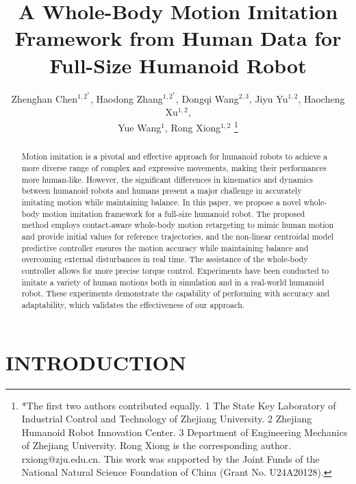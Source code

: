 \documentclass[a4paper, 10pt, conference]{ieeeconf}      %
\title{\LARGE \bf
A Whole-Body Motion Imitation Framework from Human Data for Full-Size Humanoid Robot
}
\author{Zhenghan Chen$^{1,2^*} $, Haodong Zhang$^{1,2^*}$, Dongqi Wang$^{2,3}$, Jiyu Yu$^{1,2}$, Haocheng Xu$^{1,2}$, \\ Yue Wang$^{1}$, Rong Xiong$^{1,2}$ %
\thanks{*The first two authors contributed equally. 1 The State Key Laboratory of Industrial Control and Technology of Zhejiang University. 2 Zhejiang Humanoid Robot Innovation Center. 3 Department of Engineering Mechanics of Zhejiang University. Rong Xiong is the corresponding author. rxiong@zju.edu.cn. This work was supported by the Joint Funds of the National Natural Science Foundation of China (Grant No. U24A20128).}%
}
\begin{document}
\maketitle
\thispagestyle{empty}
\pagestyle{empty}

\begin{abstract}
Motion imitation is a pivotal and effective approach for humanoid robots to achieve a more diverse range of complex and expressive movements, making their performances more human-like. However, the significant differences in kinematics and dynamics between humanoid robots and humans present a major challenge in accurately imitating motion while maintaining balance. In this paper, we propose a novel whole-body motion imitation framework for a full-size humanoid robot. The proposed method employs contact-aware whole-body motion retargeting to mimic human motion and provide initial values for reference trajectories, and the non-linear centroidal model predictive controller ensures the motion accuracy while maintaining balance and overcoming external disturbances in real time. The assistance of the whole-body controller allows for more precise torque control. Experiments have been conducted to imitate a variety of human motions both in simulation and in a real-world humanoid robot. These experiments demonstrate the capability of performing with accuracy and adaptability, which validates the effectiveness of our approach.

\end{abstract}

\section{INTRODUCTION}
\end{document}
